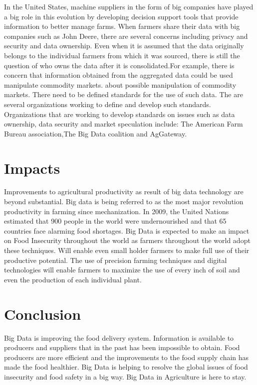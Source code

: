 \documentclass[sigconf]{acmart}
\begin{document}
In the United States, machine suppliers in the form of big companies have played a big role in this evolution by developing decision support tools that provide information to better manage farms. When farmers share their data with big companies such as John Deere, there are several concerns including privacy and security and data ownership. Even when it is assumed that the data originally belongs to the individual farmers from which it was sourced, there is still the question of who owns the data after it is consolidated.For example, there is concern that information obtained from the aggregated data could be used manipulate commodity markets. about possible manipulation of commodity markets. There need to be defined standards for the use of such data. The are several organizations working to define and develop such standards. Organizations that are working to develop standards on issues such as data ownership, data security and market speculation include: The American Farm Bureau association,The Big Data coalition and AgGateway.

\section{Impacts}

Improvements to agricultural productivity as result of big data technology are beyond substantial. Big data is being referred to as the most major revolution productivity in farming since mechanization.  In 2009, the United Nations estimated that 900 people in the world were undernourished and that 65 countries face alarming food shortages. Big Data is expected to make an impact on Food Insecurity throughout the world as farmers throughout the world adopt these techniques. Will enable even small holder farmers to make full use of their productive potential. The use of precision farming techniques and digital technologies will enable farmers to maximize the use of every inch of soil and even the production of each individual plant.

\section{Conclusion}
Big Data is improving the food delivery system. Information is available to producers and suppliers that in the past has been impossible to obtain. Food producers are more efficient and the improvements to the food supply chain has made the food healthier. Big Data is helping to resolve the global issues of food insecurity and food safety in a big way. Big Data in Agriculture is here to stay. 
\end{document}
